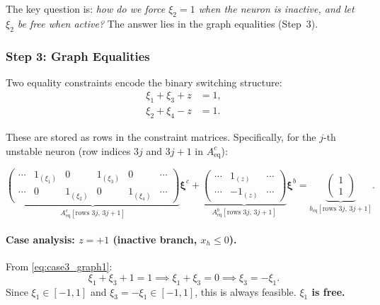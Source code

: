 \documentclass{article}
\begin{document}
The key question is: \emph{how do we force $\xi_2 = 1$ when the neuron is inactive, and let $\xi_2$ be free when active?} The answer lies in the graph equalities (Step~3).

\subsubsection{Step 3: Graph Equalities}
\label{sec:step3_graph}


Two equality constraints encode the binary switching structure:
\begin{align}
\xi_1 + \xi_3 + z &= 1, \label{eq:case3_graph1} \\
\xi_2 + \xi_4 - z &= 1. \label{eq:case3_graph2}
\end{align}

These are stored as rows in the constraint matrices. Specifically, for the $j$-th unstable neuron (row indices $3j$ and $3j{+}1$ in $A^c_{\mathrm{eq}}$):

\begin{equation}
\label{eq:graph_eq_matrix}
\underbrace{
\begin{pmatrix}
\cdots & 1_{(\xi_1)} & 0 & 1_{(\xi_3)} & 0 & \cdots \\
\cdots & 0 & 1_{(\xi_2)} & 0 & 1_{(\xi_4)} & \cdots
\end{pmatrix}
}_{A^c_{\mathrm{eq}}[\text{rows } 3j,\, 3j{+}1]}
\boldsymbol{\xi}^c
+
\underbrace{
\begin{pmatrix}
\cdots & 1_{(z)} & \cdots \\
\cdots & -1_{(z)} & \cdots
\end{pmatrix}
}_{A^b_{\mathrm{eq}}[\text{rows } 3j,\, 3j{+}1]}
\boldsymbol{\xi}^b
=
\underbrace{
\begin{pmatrix}
1 \\ 1
\end{pmatrix}
}_{b_{\mathrm{eq}}[\text{rows } 3j,\, 3j{+}1]}.
\end{equation}

\paragraph{Case analysis: $z = +1$ (inactive branch, $x_h \leq 0$).}

From \eqref{eq:case3_graph1}:
\[
\xi_1 + \xi_3 + 1 = 1 \implies \xi_1 + \xi_3 = 0 \implies \xi_3 = -\xi_1.
\]
Since $\xi_1 \in [-1,1]$ and $\xi_3 = -\xi_1 \in [-1,1]$, this is always feasible. \textbf{$\xi_1$ is free.}
\end{document}
